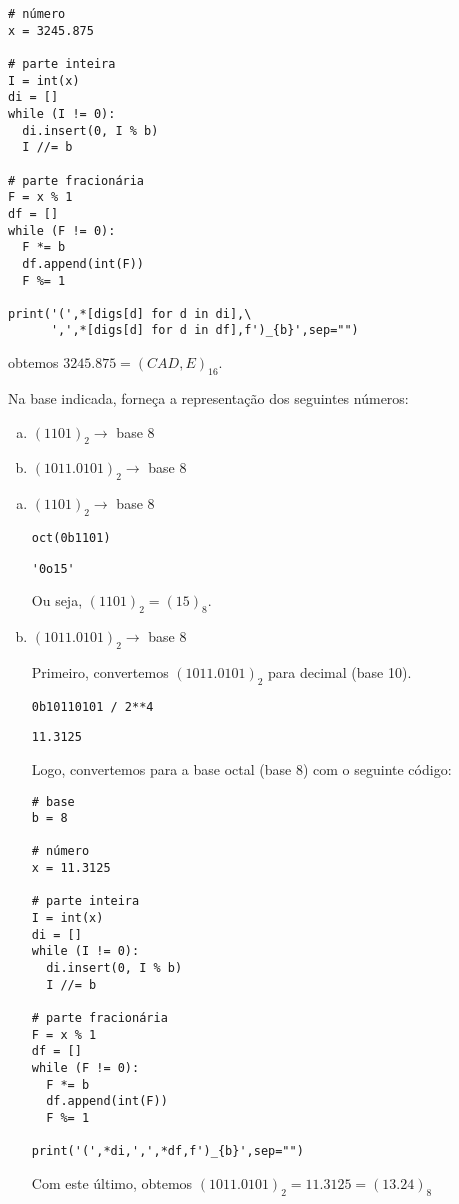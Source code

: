 \begin{resol}
\begin{enumerate}[a)]
\begin{lstlisting}
# número
x = 3245.875

# parte inteira 
I = int(x)
di = []
while (I != 0):
  di.insert(0, I % b)
  I //= b

# parte fracionária
F = x % 1
df = []
while (F != 0):
  F *= b
  df.append(int(F))
  F %= 1

print('(',*[digs[d] for d in di],\
      ',',*[digs[d] for d in df],f')_{b}',sep="")      
\end{lstlisting}

\noindent obtemos $3245.875 = (CAD,E)_{16}$.      

  \end{enumerate}
\end{resol}

\begin{exeresol}
  Na base indicada, forneça a representação dos seguintes números:
  \begin{enumerate}[a)]
  \item $(1101)_2 \to$ base 8
  \item $(1011.0101)_2 \to$ base 8
  \end{enumerate}
\end{exeresol}
\begin{resol}
  \begin{enumerate}[a)]
  \item $(1101)_2 \to$ base 8

\begin{lstlisting}
oct(0b1101)
\end{lstlisting}

\begin{verbatim}
'0o15'
\end{verbatim}
    
Ou seja, $(1101)_2 = (15)_8$.
    
  \item $(1011.0101)_2 \to$ base 8

    Primeiro, convertemos $(1011.0101)_2$ para decimal (base 10).

\begin{lstlisting}
0b10110101 / 2**4
\end{lstlisting}

\begin{verbatim}
11.3125
\end{verbatim}
    
    Logo, convertemos para a base octal (base 8) com o seguinte código:

\begin{lstlisting}
# base
b = 8

# número
x = 11.3125

# parte inteira 
I = int(x)
di = []
while (I != 0):
  di.insert(0, I % b)
  I //= b

# parte fracionária
F = x % 1
df = []
while (F != 0):
  F *= b
  df.append(int(F))
  F %= 1

print('(',*di,',',*df,f')_{b}',sep="")      
\end{lstlisting}

Com este último, obtemos $(1011.0101)_2 = 11.3125 = (13.24)_8$
  \end{enumerate}  
\end{resol}

